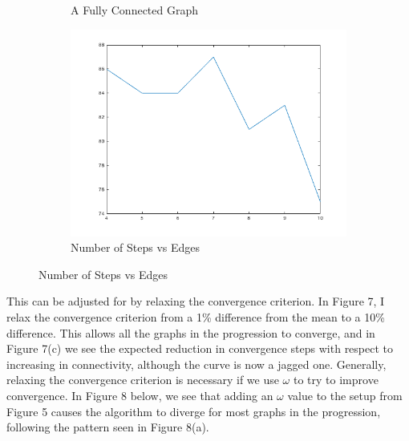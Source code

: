 \documentclass{article}
\begin{document}
\begin{figure}[h!]
\begin{subfigure}[t]{0.3\textwidth}
\caption{A Fully Connected Graph}
\end{subfigure}
\begin{subfigure}[t]{0.3\textwidth}
\centering
\includegraphics[width=\textwidth]{pi-om0-9-conv-rel.png}
\caption{Number of Steps vs Edges}
\end{subfigure}
\end{figure}
This can be adjusted for by relaxing the convergence criterion. In Figure 7, I
relax the convergence criterion from a 1\% difference from the mean to a 10\%
difference. This allows all the graphs in the progression to converge, and in
Figure 7(c) we see the expected reduction in convergence steps with respect to
increasing in connectivity, although the curve is now a jagged one. Generally,
relaxing the convergence criterion is necessary if we use $\omega$ to try to
improve convergence. In Figure 8 below, we see that adding an $\omega$ value to
the setup from Figure 5 causes the algorithm to diverge for most graphs in the
progression, following the pattern seen in Figure 8(a). 
\end{document}
